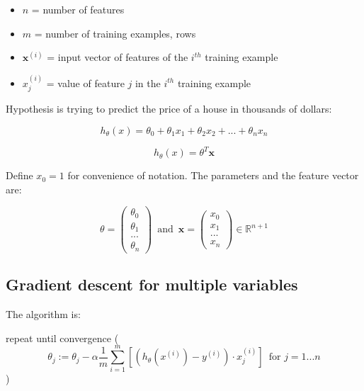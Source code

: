 \documentclass{article}
\begin{document}
\begin{itemize}
    \item $n$ = number of features
    \item $m$ = number of training examples, rows
    \item $\textbf{x}^{(i)}$ = input vector of features of the $i^{th}$ training example
    \item $x_j^{(i)}$ = value of feature $j$ in the $i^{th}$ training example
\end{itemize}


Hypothesis is trying to predict the price of a house in thousands of dollars:

\begin{equation}
    h_{\theta}(x) = \theta_0 + \theta_1 x_1 + \theta_2 x_2 + ... + \theta_n x_n
\end{equation}



\begin{equation}
    h_{\theta}(x) = {\theta}^T \textbf{x}
\end{equation}

Define $x_0 = 1$ for convenience of notation. The parameters and the feature vector are:

\begin{equation}
    \theta = \begin{pmatrix} \theta_0 \\ \theta_1 \\ ... \\ \theta_n     \end{pmatrix}
     \, \,\, \text{and} \, \, \, \textbf{x} = \begin{pmatrix}
    x_0 \\ x_1 \\ ... \\ x_n
    \end{pmatrix} \in \mathbb{R}^{n+1}
\end{equation}


\subsection{Gradient descent for multiple variables}

The algorithm is: 

repeat until convergence (
\begin{equation}
    \theta_j := \theta_j - \alpha \frac{1}{m} \sum_{i=1}^m \left[ \left(h_{\theta} (x^{(i)}) - y^{(i)}\right) \cdot x_j^{(i)} \right] \, \, \, \text{for } j = 1...n 
\end{equation})
\end{document}
